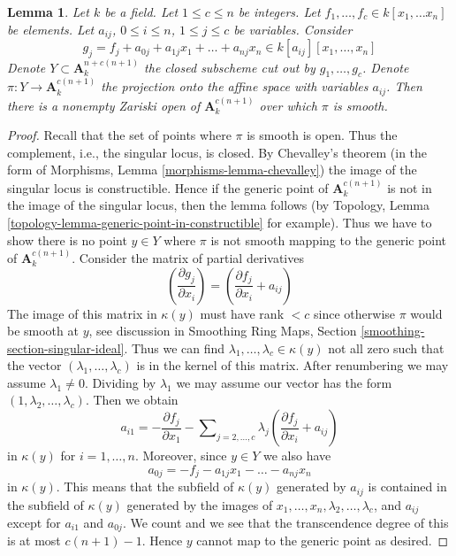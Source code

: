 \documentclass[10pt,a4paper]{amsart}
\theoremstyle{plain}
\newtheorem{lemma}[subsection]{Lemma}
\theoremstyle{definition}
\theoremstyle{remark}
\numberwithin{equation}{subsection}
\begin{document}
\begin{lemma}
\label{lemma-jouanolou-type-thing}
Let $k$ be a field. Let $1 \leq c \leq n$ be integers.
Let $f_1, \ldots, f_c \in k[x_1, \ldots x_n]$ be elements.
Let $a_{ij}$, $0 \leq i \leq n$, $1 \leq j \leq c$ be
variables. Consider
$$
g_j = f_j + a_{0j} + a_{1j}x_1 + \ldots + a_{nj}x_n \in
k[a_{ij}][x_1, \ldots, x_n]
$$
Denote $Y \subset \mathbf{A}^{n + c(n + 1)}_k$
the closed subscheme cut out by $g_1, \ldots, g_c$.
Denote $\pi : Y \to \mathbf{A}^{c(n + 1)}_k$ the projection
onto the affine space with variables $a_{ij}$.
Then there is a nonempty Zariski open 
of $\mathbf{A}^{c(n + 1)}_k$ over which $\pi$ is smooth.
\end{lemma}

\begin{proof}
Recall that the set of points where $\pi$ is smooth is open.
Thus the complement, i.e., the singular locus, is closed.
By Chevalley's theorem (in the form of
Morphisms, Lemma \ref{morphisms-lemma-chevalley})
the image of the singular locus is constructible.
Hence if the generic point of $\mathbf{A}^{c(n + 1)}_k$
is not in the image of the singular locus, then
the lemma follows (by Topology, Lemma
\ref{topology-lemma-generic-point-in-constructible} for example).
Thus we have to show there is no point
$y \in Y$ where $\pi$ is not smooth mapping to
the generic point of $\mathbf{A}^{c(n + 1)}_k$.
Consider the matrix of partial derivatives
$$
(\frac{\partial g_j}{\partial x_i}) =
(\frac{\partial f_j}{\partial x_i} + a_{ij})
$$
The image of this matrix in $\kappa(y)$ must have rank $< c$
since otherwise $\pi$ would be smooth at $y$, see discussion in
Smoothing Ring Maps, Section \ref{smoothing-section-singular-ideal}.
Thus we can find $\lambda_1, \ldots, \lambda_c \in \kappa(y)$
not all zero such that the vector $(\lambda_1, \ldots, \lambda_c)$
is in the kernel of this matrix.
After renumbering we may assume $\lambda_1 \not = 0$.
Dividing by $\lambda_1$ we may assume our vector has
the form $(1, \lambda_2, \ldots, \lambda_c)$.
Then we obtain
$$
a_{i1} = -
\frac{\partial f_j}{\partial x_1} -
\sum\nolimits_{j = 2, \ldots, c} \lambda_j(\frac{\partial f_j}{\partial x_i} + a_{ij})
$$
in $\kappa(y)$ for $i = 1, \ldots, n$. Moreover, since $y \in Y$ we also
have
$$
a_{0j} = -f_j - a_{1j}x_1 - \ldots - a_{nj}x_n
$$
in $\kappa(y)$. This means that the subfield of $\kappa(y)$
generated by $a_{ij}$ is contained in the subfield of $\kappa(y)$
generated by the images of $x_1, \ldots, x_n, \lambda_2, \ldots, \lambda_c$,
and $a_{ij}$ except for $a_{i1}$ and $a_{0j}$.
We count and we see that the transcendence degree of this is
at most $c(n + 1) - 1$. Hence $y$ cannot map to the generic point
as desired.
\end{proof}
\end{document}
